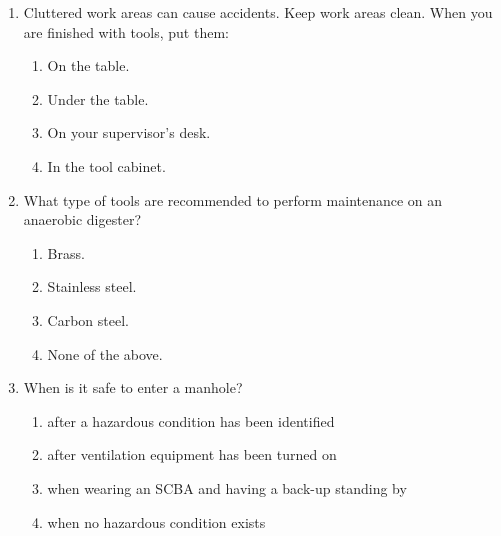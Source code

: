 \begin{tcolorbox}[breakable, enhanced,
colframe=blue!25,
colback=blue!10,
coltitle=blue!20!black,  
title= Chapter Assessment]
\begin{enumerate}
\item Cluttered work areas can cause accidents. Keep work areas clean. When you are finished with tools, put them:
\begin{enumerate}
\item On the table.
\item Under the table.
\item On your supervisor’s desk.
\item In the tool cabinet.
\end{enumerate}

\item What type of tools are recommended to perform maintenance on an anaerobic digester?
\begin{enumerate}
\item Brass.
\item Stainless steel.
\item Carbon steel.
\item None of the above.
\end{enumerate}

\item When is it safe to enter a manhole?
\begin{enumerate}
\item after a hazardous condition has been identified
\item after ventilation equipment has been turned on
\item when wearing an SCBA and having a back-up standing by
\item when no hazardous condition exists
\end{enumerate}



\end{enumerate}
\end{tcolorbox}
